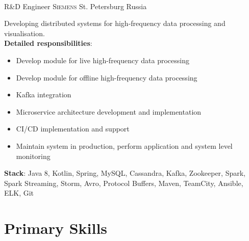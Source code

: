 \documentclass[11pt,a4paper,sans]{moderncv}
\begin{document}
\hfill \\

    {R\&D Engineer}
    {\textsc{Siemens}}
    {St. Petersburg}
    {Russia}
    {
        Developing distributed systems for high-frequency data processing and visualisation.
        \\
        \textbf{Detailed responsibilities}:
        \begin{itemize}
            \item Develop module for live high-frequency data processing
            \item Develop module for offline high-frequency data processing
            \item Kafka integration
            \item Microservice architecture development and implementation
            \item CI/CD implementation and support
            \item Maintain system in production, perform application and system level monitoring
        \end{itemize}
        \textbf{Stack}: Java 8, Kotlin, Spring, MySQL, Cassandra, Kafka, Zookeeper, Spark, Spark Streaming, Storm, Avro, Protocol Buffers, Maven, TeamCity, Ansible, ELK, Git
    }
    


\section{Primary Skills}
 


\end{document}
